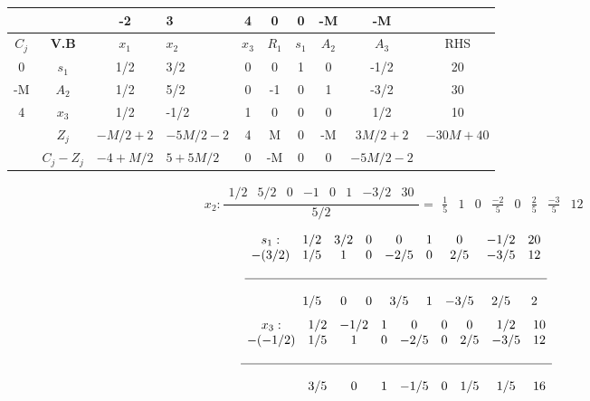 \documentclass{templateNote}
\begin{document}
\begin{center}
    \begin{tabular}{|c|c|c|g|c|c|c|c|c|c|}
        \hline
        & & -2 & 3 & 4 & 0 & 0 & -M & -M & \\ \hline
        $C_j$ & \textbf{V.B} & $x_1$ & $x_2$ & $x_3$ & $R_1$ & $s_1$ & $A_2$ & $A_3$ & RHS \\  & $s_1$ & 1/2 & 3/2 & 0 & 0 & 1 & 0 & -1/2 & 20 \\ \hline
        -M & $A_2$ & 1/2 & 5/2 & 0 & -1 & 0 & 1 & -3/2 & 30 \\  & $x_3$ & 1/2 & -1/2 & 1 & 0 & 0 & 0 & 1/2 & 10 \\ \hline
        & $Z_j$ & $-M/2 + 2$ & $-5M/2 - 2$ & 4 & M & 0 & -M & $3M/2 + 2$ & \underline{$-30M + 40$} \\ \hline
        & $C_j - Z_j$ & $-4 +M/2$ & $5+5M/2$ & 0 & -M & 0 & 0 & $-5M/2 -2$ & \\ \hline
    \end{tabular}
\end{center}
\begin{center}
    \begin{equation*}
        x_2: \frac{\begin{array}{cccccccc} 1/2 & 5/2 & 0 & -1 & 0 & 1 & -3/2 & 30 \end{array}}{5/2} = \begin{array}{cccccccc} \frac{1}{5} & 1 & 0 & \frac{-2}{5} & 0 & \frac{2}{5} & \frac{-3}{5} & 12 \end{array}
    \end{equation*}
\end{center}
\begin{equation*}
    \begin{array}{ccccccccc}
        s_1: & 1/2 & 3/2 & 0 & 0 & 1 & 0 & -1/2 & 20 \\
        -(3/2) & 1/5 & 1 & 0 & -2/5 & 0 & 2/5 & -3/5 & 12 \\
        \\ \hline \\
        & 1/5 & 0 & 0 & 3/5 & 1 & -3/5 & 2/5 & 2
    \end{array}
\end{equation*}
\vspace{0.5cm}
\begin{equation*}
    \begin{array}{ccccccccc}
        x_3: & 1/2 & -1/2 & 1 & 0 & 0 & 0 & 1/2 & 10 \\
        -(-1/2) & 1/5 & 1 & 0 & -2/5 & 0 & 2/5 & -3/5 & 12 \\
        \\ \hline \\
        & 3/5 & 0 & 1 & -1/5 & 0 & 1/5 & 1/5 & 16
    \end{array}
\end{equation*}
\end{document}
